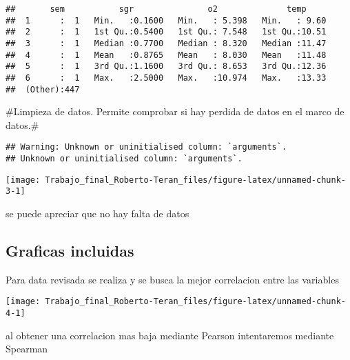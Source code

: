 \documentclass[
]{article}
\newenvironment{Shaded}{\begin{snugshade}}{\end{snugshade}}
\newcommand{\AttributeTok}[1]{\textcolor[rgb]{0.77,0.63,0.00}{#1}}
\newcommand{\FloatTok}[1]{\textcolor[rgb]{0.00,0.00,0.81}{#1}}
\newcommand{\FunctionTok}[1]{\textcolor[rgb]{0.00,0.00,0.00}{#1}}
\newcommand{\NormalTok}[1]{#1}
\newcommand{\OtherTok}[1]{\textcolor[rgb]{0.56,0.35,0.01}{#1}}
\newcommand{\SpecialCharTok}[1]{\textcolor[rgb]{0.00,0.00,0.00}{#1}}
\newcommand{\StringTok}[1]{\textcolor[rgb]{0.31,0.60,0.02}{#1}}
\begin{document}
\begin{verbatim}
##       sem           sgr               o2              temp      
##  1      :  1   Min.   :0.1600   Min.   : 5.398   Min.   : 9.60  
##  2      :  1   1st Qu.:0.5400   1st Qu.: 7.548   1st Qu.:10.51  
##  3      :  1   Median :0.7700   Median : 8.320   Median :11.47  
##  4      :  1   Mean   :0.8765   Mean   : 8.030   Mean   :11.48  
##  5      :  1   3rd Qu.:1.1600   3rd Qu.: 8.653   3rd Qu.:12.36  
##  6      :  1   Max.   :2.5000   Max.   :10.974   Max.   :13.33  
##  (Other):447
\end{verbatim}

\#Limpieza de datos. Permite comprobar si hay perdida de datos en el
marco de datos.\#

\begin{verbatim}
## Warning: Unknown or uninitialised column: `arguments`.
## Unknown or uninitialised column: `arguments`.
\end{verbatim}

\begin{center}\texttt{[image: Trabajo\_final\_Roberto-Teran\_files/figure-latex/unnamed-chunk-3-1]} \end{center}

se puede apreciar que no hay falta de datos

\hypertarget{graficas-incluidas}{%
\subsection{Graficas incluidas}\label{graficas-incluidas}}

Para data revisada se realiza y se busca la mejor correlacion entre las
variables

\begin{center}\texttt{[image: Trabajo\_final\_Roberto-Teran\_files/figure-latex/unnamed-chunk-4-1]} \end{center}

al obtener una correlacion mas baja mediante Pearson intentaremos
mediante Spearman

\begin{Shaded}
\end{Shaded}
\end{document}
